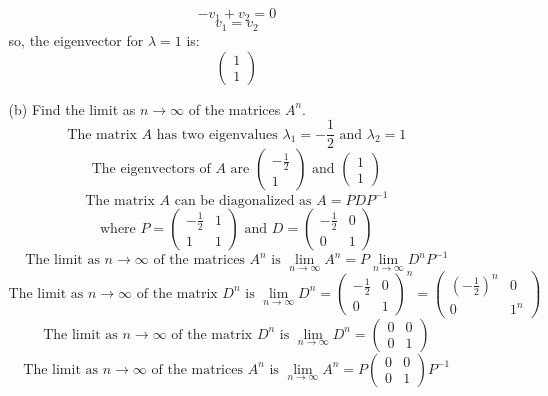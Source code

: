 \documentclass[a3paper,12pt]{extarticle} %
\begin{document}
\begin{enumerate}
\begin{enumerate}
\[        \]
        \[
            -v_1 + v_2 = 0
        \]
        \[
            v_1 = v_2
        \]
        so, the eigenvector for \(\lambda = 1\) is:
        \[
            \begin{pmatrix} 1 \\ 1 \end{pmatrix}
        \]
        \item[(b)] Find the limit as \(n \to \infty\) of the matrices \(A^n\).
        \[
            \text{The matrix } A \text{ has two eigenvalues } \lambda_1 = -\frac{1}{2} \text{ and } \lambda_2 = 1
        \]
        \[
            \text{The eigenvectors of } A \text{ are } \begin{pmatrix} -\frac{1}{2} \\ 1 \end{pmatrix} \text{ and } \begin{pmatrix} 1 \\ 1 \end{pmatrix}
        \]
        \[
            \text{The matrix } A \text{ can be diagonalized as } A = PDP^{-1}
        \]
        \[
            \text{where } P = \begin{pmatrix} -\frac{1}{2} & 1 \\ 1 & 1 \end{pmatrix} \text{ and } D = \begin{pmatrix} -\frac{1}{2} & 0 \\ 0 & 1 \end{pmatrix}
        \]
        \[
            \text{The limit as } n \to \infty \text{ of the matrices } A^n \text{ is } \lim_{n \to \infty} A^n = P \lim_{n \to \infty} D^n P^{-1}
        \]
        \[
            \text{The limit as } n \to \infty \text{ of the matrix } D^n \text{ is } \lim_{n \to \infty} D^n = \begin{pmatrix} -\frac{1}{2} & 0 \\ 0 & 1 \end{pmatrix}^n = \begin{pmatrix} \left( -\frac{1}{2} \right)^n & 0 \\ 0 & 1^n \end{pmatrix}
        \]
        \[
            \text{The limit as } n \to \infty \text{ of the matrix } D^n \text{ is } \lim_{n \to \infty} D^n = \begin{pmatrix} 0 & 0 \\ 0 & 1 \end{pmatrix}
        \]
        \[
            \text{The limit as } n \to \infty \text{ of the matrices } A^n \text{ is } \lim_{n \to \infty} A^n = P \begin{pmatrix} 0 & 0 \\ 0 & 1 \end{pmatrix} P^{-1}
\]
\end{enumerate}
\end{enumerate}
\end{document}

